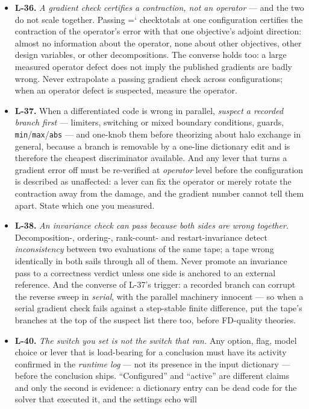 \documentclass[11pt,a4paper]{article}
\newcommand{\artifact}[1]{{\small\ttfamily\hyphenchar\font=`\-\relax
  \def\_{\textunderscore\allowbreak}#1}}
\begin{document}
\begin{itemize}
\item \textbf{L-36.} \emph{A gradient check certifies a contraction, not an operator} --- and
the two do not scale together. Passing \artifact{check\_totals} at one configuration certifies
the contraction of the operator's error with that one objective's adjoint direction: almost no
information about the operator, none about other objectives, other design variables, or other
decompositions. The converse holds too: a large measured operator defect does not imply the
published gradients are badly wrong. Never extrapolate a passing gradient check across
configurations; when an operator defect is suspected, measure the operator.
\item \textbf{L-37.} When a differentiated code is wrong in parallel, \emph{suspect a recorded
branch first} --- limiters, switching or mixed boundary conditions, guards,
\texttt{min}/\texttt{max}/\texttt{abs} --- and one-knob them before theorizing about halo
exchange in general, because a branch is removable by a one-line dictionary edit and is
therefore the cheapest discriminator available. And any lever that turns a gradient error off
must be re-verified at \emph{operator} level before the configuration is described as
unaffected: a lever can fix the operator or merely rotate the contraction away from the
damage, and the gradient number cannot tell them apart. State which one you measured.
\item \textbf{L-38.} \emph{An invariance check can pass because both sides are wrong
together.} Decomposition-, ordering-, rank-count- and restart-invariance detect
\emph{inconsistency} between two evaluations of the same tape; a tape wrong identically in both
sails through all of them. Never promote an invariance pass to a correctness verdict unless one
side is anchored to an external reference. And the converse of L-37's trigger: a recorded
branch can corrupt the reverse sweep in \emph{serial}, with the parallel machinery innocent ---
so when a serial gradient check fails against a step-stable finite difference, put the tape's
branches at the top of the suspect list there too, before FD-quality theories.
\item \textbf{L-40.} \emph{The switch you set is not the switch that ran.} Any option, flag,
model choice or lever that is load-bearing for a conclusion must have its activity confirmed in
the \emph{runtime log} --- not its presence in the input dictionary --- before the conclusion
ships. ``Configured'' and ``active'' are different claims and only the second is evidence: a
dictionary entry can be dead code for the solver that executed it, and the settings echo will

\end{itemize}
\end{document}
